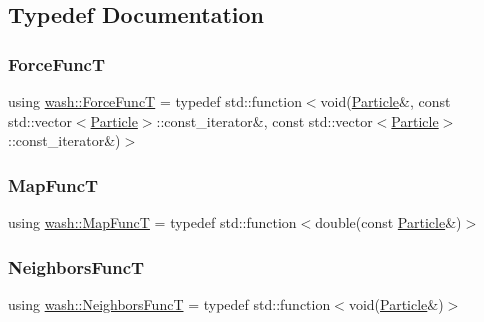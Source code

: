 \subsection{Typedef Documentation}
\mbox{\label{namespacewash_a3687ea698f8cb8c077d728e5d74de495}} 
\subsubsection{\texorpdfstring{Force\+FuncT}{ForceFuncT}}
{\footnotesize\ttfamily using \mbox{\hyperlink{namespacewash_a3687ea698f8cb8c077d728e5d74de495}{wash\+::\+Force\+FuncT}} = typedef std\+::function$<$void(\mbox{\hyperlink{classwash_1_1Particle}{Particle}}\&, const std\+::vector$<$\mbox{\hyperlink{classwash_1_1Particle}{Particle}}$>$\+::const\+\_\+iterator\&, const std\+::vector$<$\mbox{\hyperlink{classwash_1_1Particle}{Particle}}$>$\+::const\+\_\+iterator\&)$>$}

\mbox{\label{namespacewash_ad515914307c88c01ff7524c57feabf83}} 
\subsubsection{\texorpdfstring{Map\+FuncT}{MapFuncT}}
{\footnotesize\ttfamily using \mbox{\hyperlink{namespacewash_ad515914307c88c01ff7524c57feabf83}{wash\+::\+Map\+FuncT}} = typedef std\+::function$<$double(const \mbox{\hyperlink{classwash_1_1Particle}{Particle}}\&)$>$}

\mbox{\label{namespacewash_a8135d763bfc59fce07b49873d8af0ed6}} 
\subsubsection{\texorpdfstring{Neighbors\+FuncT}{NeighborsFuncT}}
{\footnotesize\ttfamily using \mbox{\hyperlink{namespacewash_a8135d763bfc59fce07b49873d8af0ed6}{wash\+::\+Neighbors\+FuncT}} = typedef std\+::function$<$void(\mbox{\hyperlink{classwash_1_1Particle}{Particle}}\&)$>$}

\mbox{\label{namespacewash_ab2cbbc37941b733095c9225b49b4cad9}} 
